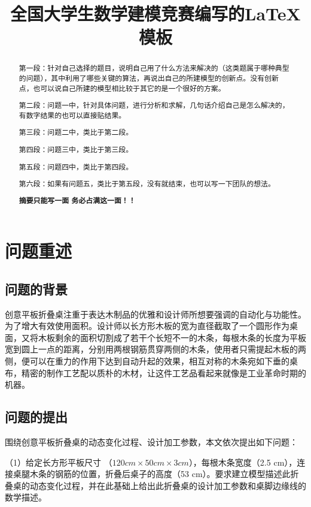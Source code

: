 \documentclass{cumcmthesis}
\title{全国大学生数学建模竞赛编写的LaTeX模板}
\begin{document}
	
	\maketitle
	
	\begin{abstract}
		第一段：针对自己选择的题目，说明自己用了什么方法来解决的（这类题属于哪种典型的问题），其中利用了哪些关键的算法，再说出自己的所建模型的创新点。没有创新点，也可以说自己所建的模型相比较于其它的是一个很好的方案。
		
		第二段：问题一中，针对具体问题，进行分析和求解，几句话介绍自己是怎么解决的，有数字结果的也可以直接贴结果。
		
		第三段：问题二中，类比于第二段。
		
		第四段：问题三中，类比于第三段。
		
		第五段：问题四中，类比于第四段。
		
		第六段：如果有问题五，类比于第五段，没有就结束，也可以写一下团队的想法。
		
		\textbf{摘要只能写一面 务必占满这一面！！}
		
	\end{abstract}
	
	\tableofcontents
	\newpage	%
	
	\section{问题重述}
	\subsection{问题的背景}
	创意平板折叠桌注重于表达木制品的优雅和设计师所想要强调的自动化与功能性。为了增大有效使用面积。设计师以长方形木板的宽为直径截取了一个圆形作为桌面，又将木板剩余的面积切割成了若干个长短不一的木条，每根木条的长度为平板宽到圆上一点的距离，分别用两根钢筋贯穿两侧的木条，使用者只需提起木板的两侧，便可以在重力的作用下达到自动升起的效果，相互对称的木条宛如下垂的桌布，精密的制作工艺配以质朴的木材，让这件工艺品看起来就像是工业革命时期的机器。
	
	\subsection{问题的提出}
	
	围绕创意平板折叠桌的动态变化过程、设计加工参数，本文依次提出如下问题：
	
	（1）给定长方形平板尺寸 （$120 cm \times 50 cm \times 3 cm$），每根木条宽度（2.5 cm），连接桌腿木条的钢筋的位置，折叠后桌子的高度（53 cm）。要求建立模型描述此折叠桌的动态变化过程，并在此基础上给出此折叠桌的设计加工参数和桌脚边缘线的数学描述。
	
\end{document}
